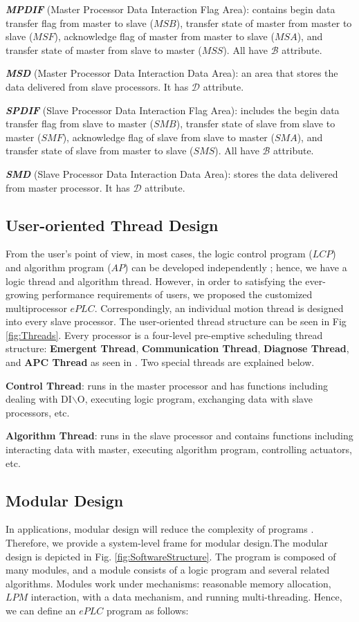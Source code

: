\documentclass[journal,UTF8]{IEEEtran}
\begin{document}
	\textbf{\emph{MPDIF}} (Master Processor Data Interaction Flag Area): contains begin data transfer flag from master to slave ($MSB$), transfer state of master from master to slave ($MSF$), acknowledge flag of master from master to slave ($MSA$), and transfer state of master from slave to master ($MSS$). All have $\mathcal{B}$ attribute.
	
	\textbf{\emph{MSD}} (Master Processor Data Interaction Data Area): an area that stores the data delivered from slave processors. It has $\mathcal{D}$ attribute.
	
	\textbf{\emph{SPDIF}} (Slave Processor Data Interaction Flag Area): includes the begin data transfer flag from slave to master ($SMB$), transfer state of slave from slave to master ($SMF$), acknowledge flag of slave from slave to master ($SMA$), and transfer state of slave from master to slave ($SMS$). All have $\mathcal{B}$ attribute.
	
	\textbf{\emph{SMD}} (Slave Processor Data Interaction Data Area): stores the data delivered from master processor. It has $\mathcal{D}$ attribute.
	
	\subsection{User-oriented Thread Design}
	From the user's point of view, in most cases, the logic control program ($LCP$) and algorithm program ($AP$) can be developed independently \cite{WuA}; hence, we have a logic thread and algorithm thread. However, in order to satisfying the ever-growing performance requirements of users, we proposed the customized multiprocessor $ePLC$. Correspondingly, an individual motion thread is designed into every slave processor. The user-oriented thread structure can be seen in Fig \ref{fig:Threads}. Every processor is a four-level pre-emptive scheduling thread structure: \textbf{Emergent Thread}, \textbf{Communication Thread}, \textbf{Diagnose Thread}, and \textbf{APC Thread} as seen in \cite{WuA}. Two special threads are explained below.
	
	\textbf{Control Thread}: runs in the master processor and has functions including dealing with DI$\backslash$O, executing logic program, exchanging data with slave processors, etc.
	
	\textbf{Algorithm Thread}: runs in the slave processor and contains functions including interacting data with master, executing algorithm program, controlling actuators, etc.
	
	\subsection{Modular Design}  
	In applications, modular design will reduce the complexity of programs \cite{Vyatkin2013Software}. Therefore, we provide a system-level frame for modular design.The modular design is depicted in Fig. \ref{fig:SoftwareStructure}. The program is composed of many modules, and a module consists of a logic program and several related algorithms. Modules work under mechanisms: reasonable memory allocation, $LPM$ interaction, with a data mechanism, and running multi-threading. Hence, we can define an $ePLC$ program as follows:
	
\end{document}
